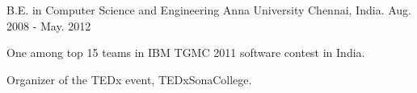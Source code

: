 

\begin{cventries}

  \cventry
    {B.E. in Computer Science and Engineering} %
    {Anna University} %
    {Chennai, India.} %
    {Aug. 2008 - May. 2012} %
    {
      \begin{cvitems} %
        \item {One among top 15 teams in IBM TGMC 2011 software contest in India.}
        \item {Organizer of the TEDx event, TEDxSonaCollege.}
      \end{cvitems}
    }

\end{cventries}
